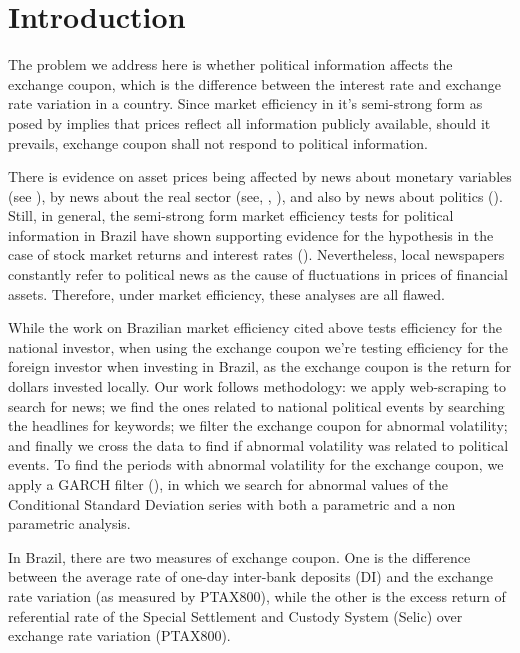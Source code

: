 \documentclass[cic,tc, english]{iiufrgs}
\begin{document}
\tableofcontents


\chapter{Introduction} \label{chapter_introduction}

    The problem we address here is whether political information affects the exchange coupon, which is the difference between the interest rate and exchange rate variation in a country. Since market efficiency in it's semi-strong form as posed by  \citet{fama1970} implies that prices reflect all information publicly available, should it prevails, exchange coupon shall not respond to political information.
  
    There is evidence on asset prices being affected by news about monetary variables (see \citet{cornell1983}), by news about the real sector (see, \citet{mcqueenroley1993}, \citet{caporaleetal2015}), and also by news about politics (\citet{marquessantos2016}). Still, in general, the semi-strong form market efficiency tests for political information in Brazil have shown supporting evidence for the hypothesis in the case of stock market returns and interest rates (\citet{marquessantos2016}). Nevertheless, local newspapers constantly refer to political news as the cause of fluctuations in prices of financial assets. Therefore, under market efficiency, these analyses are all flawed.
  
    While the work on Brazilian market efficiency cited above tests efficiency for the national investor, when using the exchange coupon we're testing efficiency for the foreign investor when investing in Brazil, as the exchange coupon is the return for dollars invested locally. Our work follows \citet{marquessantos2016} methodology: we apply web-scraping to search for news; we find the ones related to national political events by searching the headlines for keywords; we filter the exchange coupon for abnormal volatility; and finally we cross the data to find if abnormal volatility was related to political events. To find the periods with abnormal volatility for the exchange coupon, we apply a GARCH filter (\citet{bollerslev1986}), in which we search for abnormal values of the Conditional Standard Deviation series with both a parametric and a non parametric analysis.

    In Brazil, there are two measures of exchange coupon. One is the difference between the average rate of one-day inter-bank deposits (DI) and the exchange rate variation (as measured by PTAX800), while the other is the excess return of referential rate of the Special Settlement and Custody System (Selic) over exchange rate variation (PTAX800). 
  
\end{document}
